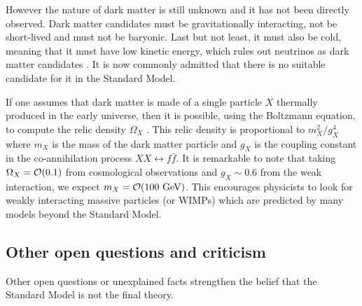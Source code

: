     However the nature of dark matter is still unknown and it has not been
    directly observed.  Dark matter candidates must be gravitationally
    interacting, not be short-lived and must not be baryonic. Last but not
    least, it must also be cold, meaning that it must have low kinetic energy,
    which rules out neutrinos as dark matter candidates \cite{NeutrinoNotDM}. It
    is now commonly admitted that there is no suitable candidate for it in the
    Standard Model.

    If one assumes that dark matter is made of a single particle $X$ thermally
    produced in the early universe, then it is possible, using the Boltzmann
    equation, to compute the relic density $\Omega_X$ \cite{DMPrimer,
    NeutralinoRelic, WIMPRelic}. This relic density is proportional to $m_X^2 /
    g^4_X$ where $m_X$ is the mass of the dark matter particle and $g_X$ is the
    coupling constant in the co-annihilation process $XX \leftrightarrow
    f\bar{f}$.  It is remarkable to note that taking $\Omega_X = \mathcal{O}(0.1)$
    from cosmological observations and $g_X \sim 0.6$ from the weak interaction,
    we expect $m_X = \mathcal{O}(100~\text{GeV})$. This encourages physicists to look for
    weakly interacting massive particles (or WIMPs) which are predicted by many
    models beyond the Standard Model.

        \subsection{Other open questions and criticism}

    Other open questions or unexplained facts strengthen the belief that the
    Standard Model is not the final theory.

